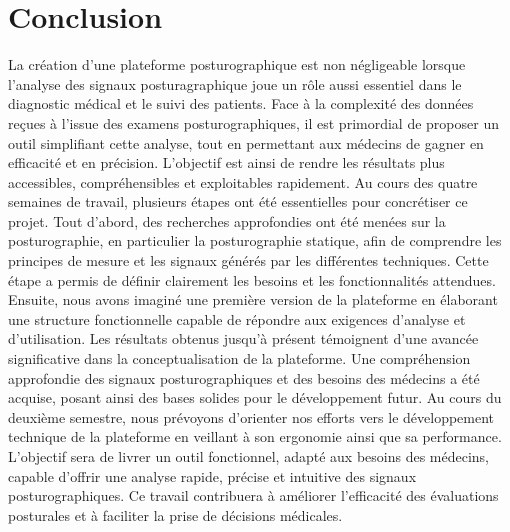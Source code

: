 \section{Conclusion}

La création d'une plateforme posturographique est non négligeable lorsque  l'analyse des signaux posturagraphique joue un rôle aussi essentiel dans le diagnostic médical et le suivi des patients. Face à la complexité des données reçues à l’issue des examens posturographiques, il est primordial de proposer un outil simplifiant cette analyse, tout en permettant aux médecins de gagner en efficacité et en précision. L'objectif est ainsi de rendre les résultats plus accessibles, compréhensibles et exploitables rapidement.
Au cours des quatre semaines de travail,  plusieurs étapes ont été essentielles pour concrétiser ce projet. Tout d'abord, des recherches approfondies ont été menées sur la posturographie, en particulier la posturographie statique, afin de comprendre les principes de mesure et les signaux générés par les différentes techniques. Cette étape a permis de définir clairement les besoins et les fonctionnalités attendues. Ensuite, nous avons imaginé une première version de la plateforme en élaborant une structure fonctionnelle capable de répondre aux exigences d'analyse et d'utilisation.
Les résultats obtenus jusqu'à présent témoignent d'une avancée significative dans la conceptualisation de la plateforme. Une compréhension approfondie des signaux posturographiques et des besoins des médecins a été acquise, posant ainsi des bases solides pour le développement futur.
Au cours du deuxième semestre, nous prévoyons d'orienter nos efforts vers le développement technique de la plateforme en veillant à son ergonomie ainsi que sa performance. L'objectif sera de livrer un outil fonctionnel, adapté aux besoins des médecins, capable d'offrir une analyse rapide, précise et intuitive des signaux posturographiques. Ce travail contribuera à améliorer l'efficacité des évaluations posturales et à faciliter la prise de décisions médicales.
